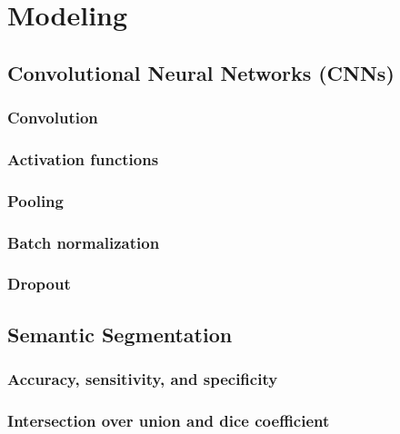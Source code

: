 \chapter{Modeling}%
\label{sec:modeling}


\section{Convolutional Neural Networks (CNNs)}%
\label{sec:cnn}

\subsection{Convolution}

\subsection{Activation functions}

\subsection{Pooling}

\subsection{Batch normalization}

\subsection{Dropout}



\section{Semantic Segmentation}%
\label{sec:semantic-segmentation}

\subsection{Accuracy, sensitivity, and specificity}

\subsection{Intersection over union and dice coefficient}

